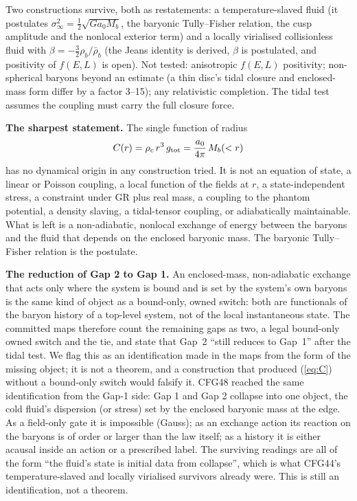 \documentclass[10pt]{article}
\begin{document}
Two constructions survive, both as restatements: a temperature-slaved fluid (it postulates $\sigma_\infty^2=\tfrac12\sqrt{Ga_0M_b}$, the baryonic Tully--Fisher relation, the cusp amplitude and the nonlocal exterior term) and a locally virialised collisionless fluid with $\beta=-\tfrac32\rho_b/\bar\rho_b$ (the Jeans identity is derived, $\beta$ is postulated, and positivity of $f(E,L)$ is open). Not tested: anisotropic $f(E,L)$ positivity; non-spherical baryons beyond an estimate (a thin disc's tidal closure and enclosed-mass form differ by a factor 3--15); any relativistic completion. The tidal test assumes the coupling must carry the full closure force.

\textbf{The sharpest statement.} The single function of radius
\begin{equation}
C(r)=\rho_c\,r^3\,g_{\rm tot}=\frac{a_0}{4\pi}\,M_b(<r)\label{eq:C}
\end{equation}
has no dynamical origin in any construction tried. It is not an equation of state, a linear or Poisson coupling, a local function of the fields at $r$, a state-independent stress, a constraint under GR plus real mass, a coupling to the phantom potential, a density slaving, a tidal-tensor coupling, or adiabatically maintainable. What is left is a non-adiabatic, nonlocal exchange of energy between the baryons and the fluid that depends on the enclosed baryonic mass. The baryonic Tully--Fisher relation is the postulate.

\textbf{The reduction of Gap 2 to Gap 1.} An enclosed-mass, non-adiabatic exchange that acts only where the system is bound and is set by the system's own baryons is the same kind of object as a bound-only, owned switch: both are functionals of the baryon history of a top-level system, not of the local instantaneous state. The committed maps therefore count the remaining gaps as two, a legal bound-only owned switch and the tie, and state that Gap~2 ``still reduces to Gap~1'' after the tidal test. We flag this as an identification made in the maps from the form of the missing object; it is not a theorem, and a construction that produced (\ref{eq:C}) without a bound-only switch would falsify it. CFG48 reached the same identification from the Gap-1 side: Gap 1 and Gap 2 collapse into one object, the cold fluid's dispersion (or stress) set by the enclosed baryonic mass at the edge. As a field-only gate it is impossible (Gauss); as an exchange action its reaction on the baryons is of order or larger than the law itself; as a history it is either acausal inside an action or a prescribed label. The surviving readings are all of the form ``the fluid's state is initial data from collapse'', which is what CFG44's temperature-slaved and locally virialised survivors already were. This is still an identification, not a theorem.
\end{document}
